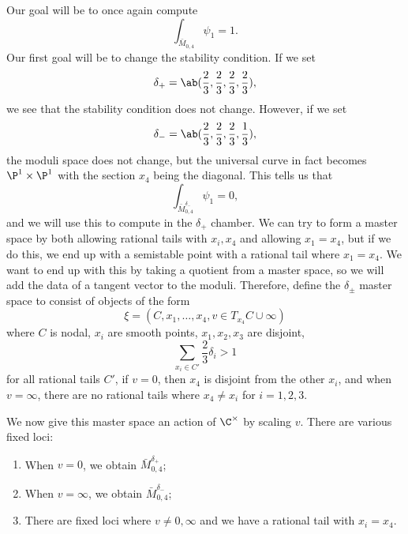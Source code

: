 \begin{exm}
    Our goal will be to once again compute
    \[ \int_{\bar{M}_{0,4}} \psi_1 = 1. \]
    Our first goal will be to change the stability condition. If we set
    \[ \delta_+ = \ab(\frac{2}{3}, \frac{2}{3}, \frac{2}{3}, \frac{2}{3}), \]
    we see that the stability condition does not change. However, if we set
    \[ \delta_- = \ab(\frac{2}{3}, \frac{2}{3}, \frac{2}{3}, \frac{1}{3}), \]
    the moduli space does not change, but the universal curve in fact becomes \(\P^1 \times \P^1\) with the section \(x_4\) being the diagonal. This tells us that
    \[ \int_{\bar{M}_{0,4}^{\delta_-}} \psi_1 = 0, \]
    and we will use this to compute in the \(\delta_+\) chamber. We can try to form a master space by both allowing rational tails with \(x_i, x_4\) and allowing \(x_1 = x_4\), but if we do this, we end up with a semistable point with a rational tail where \(x_1 = x_4\). We want to end up with this by taking a quotient from a master space, so we will add the data of a tangent vector to the moduli. Therefore, define the \(\delta_{\pm}\) master space to consist of objects of the form
    \[ \xi = (C, x_1, \ldots, x_4, v \in T_{x_4} C \cup \infty) \]
    where \(C\) is nodal, \(x_i\) are smooth points, \(x_1, x_2, x_3\) are disjoint,
    \[ \sum_{x_i \in C'} \frac{2}{3} \delta_i > 1 \]
    for all rational tails \(C'\), if \(v = 0\), then \(x_4\) is disjoint from the other \(x_i\), and when \(v = \infty\), there are no rational tails where \(x_4 \neq x_i\) for \(i = 1,2,3\). 

    We now give this master space an action of \(\C^{\times}\) by scaling \(v\). There are various fixed loci:
    \begin{enumerate}
        \item When \(v = 0\), we obtain \(\bar{M}_{0,4}^{\delta_+}\);
        \item When \(v = \infty\), we obtain \(\bar{M}_{0,4}^{\delta_-}\);
        \item There are fixed loci where \(v \neq 0,\infty\) and we have a rational tail with \(x_i = x_4\).
    \end{enumerate}


\end{exm}
